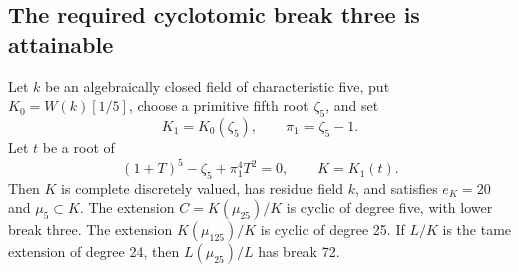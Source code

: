 \subsection{The required cyclotomic break three is attainable}

\begin{lemma}
\label{lem:B-RD89-base}
Let \(k\) be an algebraically closed field of characteristic five,
put \(K_0=W(k)[1/5]\), choose a primitive fifth root \(\zeta_5\),
and set
\[
 K_1=K_0(\zeta_5),\qquad \pi_1=\zeta_5-1.
\]
Let \(t\) be a root of
\[
       (1+T)^5-\zeta_5+\pi_1^4T^2=0,
       \qquad K=K_1(t).                              \tag{B-RD89.1}
\]
Then \(K\) is complete discretely valued, has residue field \(k\),
and satisfies \(e_K=20\) and \(\mu_5\subset K\).
The extension \(C=K(\mu_{25})/K\) is cyclic of degree five,
with lower break three. The extension \(K(\mu_{125})/K\)
is cyclic of degree 25. If \(L/K\) is the tame extension
of degree 24, then \(L(\mu_{25})/L\) has break 72.
\end{lemma}
